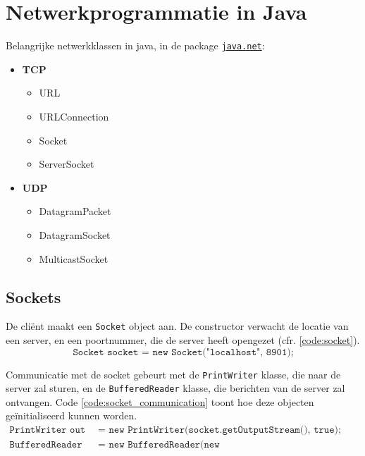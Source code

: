 \documentclass{report}
\begin{document}
\chapter{Netwerkprogrammatie in Java}
Belangrijke netwerkklassen in java, in de package \underline{\texttt{java.net}}:
\begin{itemize}
    \item \textbf{TCP} 
        \begin{itemize}
            \item URL
            \item URLConnection
            \item Socket
            \item ServerSocket
        \end{itemize}
    \item \textbf{UDP}
        \begin{itemize}
            \item DatagramPacket
            \item DatagramSocket
            \item MulticastSocket
        \end{itemize}
\end{itemize}
\section{Sockets}
De cliënt maakt een \texttt{Socket} object aan. De constructor verwacht de locatie van een server, en een poortnummer, die de server heeft opengezet (cfr. \ref{code:socket}).
\begin{equation}
	\texttt{Socket socket = new Socket("localhost", 8901);}
	\label{code:socket}
\end{equation}

 Communicatie met de socket gebeurt met de \texttt{PrintWriter} klasse, die naar de server zal sturen, en de \texttt{BufferedReader} klasse, die berichten van de server zal ontvangen. Code \ref{code:socket_communication} toont hoe deze objecten geïnitialiseerd kunnen worden.
 \begin{equation}
	\begin{split}
		\texttt{PrintWriter out} & \texttt{ = new PrintWriter(socket.getOutputStream(), true);} \\
		\texttt{BufferedReader in} & \texttt{ = new BufferedReader(new InputStreamReader(socket.getInputStream()));}
	\end{split}
	\label{code:socket_communication}
 \end{equation}
\end{document}
